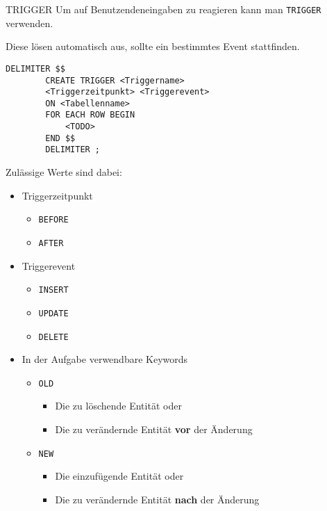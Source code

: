 \begin{sql}{TRIGGER}
    Um auf Benutzendeneingaben zu reagieren kann man \texttt{TRIGGER} verwenden.

    Diese lösen automatisch aus, sollte ein bestimmtes Event stattfinden.

    \begin{lstlisting}[language=mysql]
        DELIMITER $$
        CREATE TRIGGER <Triggername>
        <Triggerzeitpunkt> <Triggerevent>
        ON <Tabellenname>
        FOR EACH ROW BEGIN
            <TODO>
        END $$
        DELIMITER ;
    \end{lstlisting}

    Zulässige Werte sind dabei:

    \begin{itemize}
        \item Triggerzeitpunkt
        
            \begin{itemize}
                \item \texttt{BEFORE}
                \item \texttt{AFTER}
            \end{itemize}
        \item Triggerevent
        
            \begin{itemize}
                \item \texttt{INSERT}
                \item \texttt{UPDATE}
                \item \texttt{DELETE}
            \end{itemize}
        \item In der Aufgabe verwendbare Keywords
        
            \begin{itemize}
                \item \texttt{OLD}
                
                    \begin{itemize}
                        \item Die zu löschende Entität oder
                        \item Die zu verändernde Entität \textbf{vor} der Änderung
                    \end{itemize}
                \item \texttt{NEW}
                
                    \begin{itemize}
                        \item Die einzufügende Entität oder
                        \item Die zu verändernde Entität \textbf{nach} der Änderung
                    \end{itemize}
            \end{itemize}
    \end{itemize}


\end{sql}
